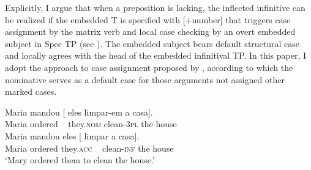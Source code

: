 \documentclass[output=paper]{langsci/langscibook}
\begin{document}
Explicitly, I argue that when a preposition is lacking, the inflected infinitive can be realized if the embedded T is specified with [+number] that triggers case assignment by the matrix verb and local case checking by an overt embedded subject in Spec TP (see \citealt{Raposo1987}). The embedded subject bears default structural case and locally agrees with the head of the embedded infinitival TP. In this paper, I adopt the approach to case assignment proposed by \citet{McFadden2011}, according to which the nominative serves as a default case for those arguments not assigned other marked cases.

\ea%
    \label{ex:moreno:28}
    \ea
    \gll Maria mandou [ eles          limpar-em   a     casa].    \\
         Maria ordered  ~ they.\textsc{nom}   clean-\textsc{3pl}     the house\\
    \ex  
    \gll Maria mandou   eles [  limpar      a    casa]. \\
         Maria ordered   they.\textsc{acc}  ~ clean-\textsc{inf} the house \\
    \glt ‘Mary ordered them to clean the house.’
    \z
\z
\end{document}
